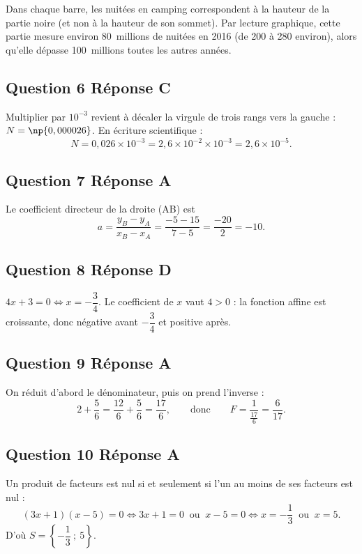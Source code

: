 Dans chaque barre, les nuitées en camping correspondent à la hauteur de la partie
noire (et non à la hauteur de son sommet). Par lecture graphique, cette partie mesure
environ 80~millions de nuitées en 2016 (de 200 à 280 environ), alors qu'elle dépasse
100~millions toutes les autres années.

\subsection*{Question 6 \quad Réponse C}

Multiplier par $10^{-3}$ revient à décaler la virgule de trois rangs vers la gauche :
$N = \np{0,000026}$. En écriture scientifique :
\[N = 0,026 \times 10^{-3} = 2,6 \times 10^{-2} \times 10^{-3} = 2,6 \times 10^{-5}.\]

\subsection*{Question 7 \quad Réponse A}

Le coefficient directeur de la droite (AB) est
\[a = \dfrac{y_B - y_A}{x_B - x_A} = \dfrac{-5 - 15}{7 - 5} = \dfrac{-20}{2} = -10.\]

\subsection*{Question 8 \quad Réponse D}

$4x + 3 = 0 \iff x = -\dfrac{3}{4}$. Le coefficient de $x$ vaut $4 > 0$ : la fonction
affine est croissante, donc négative avant $-\dfrac{3}{4}$ et positive après.

\subsection*{Question 9 \quad Réponse A}

On réduit d'abord le dénominateur, puis on prend l'inverse :
\[2 + \dfrac{5}{6} = \dfrac{12}{6} + \dfrac{5}{6} = \dfrac{17}{6},
\qquad\text{donc}\qquad
F = \dfrac{1}{\frac{17}{6}} = \dfrac{6}{17}.\]

\subsection*{Question 10 \quad Réponse A}

Un produit de facteurs est nul si et seulement si l'un au moins de ses facteurs est nul :
\[(3x+1)(x-5) = 0 \iff 3x + 1 = 0 \ \text{ ou } \ x - 5 = 0
\iff x = -\dfrac{1}{3} \ \text{ ou } \ x = 5.\]
D'où $S = \left\{-\dfrac{1}{3}~;~5\right\}$.


